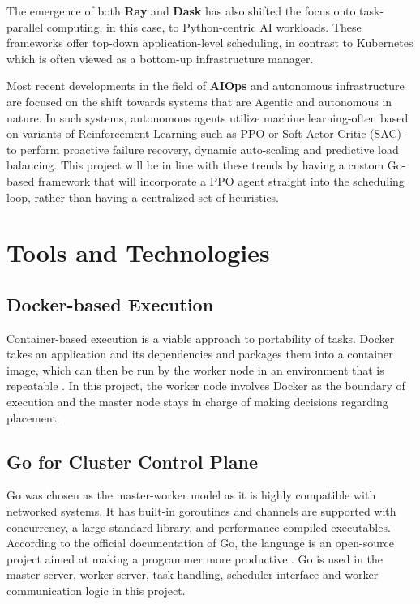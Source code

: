 The emergence of both \textbf{Ray} \cite{moritz2018ray} and \textbf{Dask} has also shifted the focus onto task-parallel computing, in this case, to Python-centric AI workloads. These frameworks offer top-down application-level scheduling, in contrast to Kubernetes which is often viewed as a bottom-up infrastructure manager.

Most recent developments in the field of \textbf{AIOps} and autonomous infrastructure are focused on the shift towards systems that are Agentic and autonomous in nature. In such systems, autonomous agents utilize machine learning-often based on variants of Reinforcement Learning such as PPO \cite{schulman2017ppo} or Soft Actor-Critic (SAC) \cite{haarnoja2018sac}-to perform proactive failure recovery, dynamic auto-scaling and predictive load balancing. This project will be in line with these trends by having a custom Go-based framework that will incorporate a PPO agent straight into the scheduling loop, rather than having a centralized set of heuristics.

\section{Tools and Technologies}
\label{section:tools_technologies}

\subsection{Docker-based Execution}

Container-based execution is a viable approach to portability of tasks. Docker takes an application and its dependencies and packages them into a container image, which can then be run by the worker node in an environment that is repeatable \cite{dockerdocs}. In this project, the worker node involves Docker as the boundary of execution and the master node stays in charge of making decisions regarding placement.

\subsection{Go for Cluster Control Plane}

Go was chosen as the master-worker model as it is highly compatible with networked systems. It has built-in goroutines and channels are supported with concurrency, a large standard library, and performance compiled executables. According to the official documentation of Go, the language is an open-source project aimed at making a programmer more productive \cite{godocs}. Go is used in the master server, worker server, task handling, scheduler interface and worker communication logic in this project.


